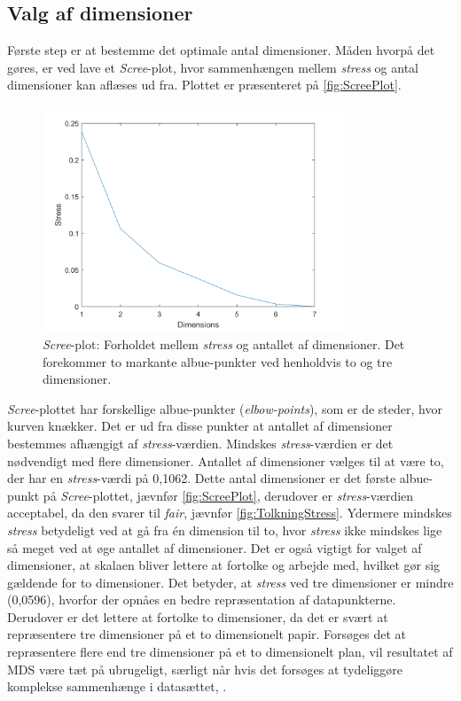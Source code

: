 \subsection*{Valg af dimensioner}
%
Første step er at bestemme det optimale antal dimensioner. Måden hvorpå det gøres, er ved lave et \textit{Scree}-plot, hvor sammenhængen mellem \textit{stress} og antal dimensioner kan aflæses ud fra. Plottet er præsenteret på \autoref{fig:ScreePlot}. 
%
\begin{figure}[H]
\centering
\includegraphics[width = 0.8\textwidth]{Figure/screeplot.png} 
\caption{\textit{Scree}-plot: Forholdet mellem \textit{stress} og antallet af dimensioner. Det forekommer to markante albue-punkter ved henholdvis to og tre dimensioner.}
\label{fig:ScreePlot}
\end{figure}

%
\textit{Scree}-plottet har forskellige albue-punkter (\textit{elbow-points}), som er de steder, hvor kurven knækker. Det er ud fra disse punkter at antallet af dimensioner bestemmes afhængigt af \textit{stress}-værdien. Mindskes \textit{stress}-værdien er det nødvendigt med flere dimensioner.\blankline  
%
Antallet af dimensioner vælges til at være to, der har en \textit{stress}-værdi på 0,1062. Dette antal dimensioner er det første albue-punkt på \textit{Scree}-plottet, jævnfør \autoref{fig:ScreePlot}, derudover er \textit{stress}-værdien acceptabel, da den svarer til \textit{fair}, jævnfør \autoref{fig:TolkningStress}. Ydermere mindskes \textit{stress} betydeligt ved at gå fra én dimension til to, hvor \textit{stress} ikke mindskes lige så meget ved at øge antallet af dimensioner. Det er også vigtigt for valget af dimensioner, at skalaen bliver lettere at fortolke og arbejde med, hvilket gør sig gældende for to dimensioner. Det betyder, at \textit{stress} ved tre dimensioner er mindre (0,0596), hvorfor der opnåes en bedre repræsentation af datapunkterne. Derudover er det lettere at fortolke to dimensioner, da det er svært at repræsentere tre dimensioner på et to dimensionelt papir. Forsøges det at repræsentere flere end tre dimensioner på et to dimensionelt plan, vil resultatet af MDS være tæt på ubrugeligt, særligt når hvis det  forsøges at tydeliggøre komplekse sammenhænge i datasættet, \parencite{Borgatti1997}. 

